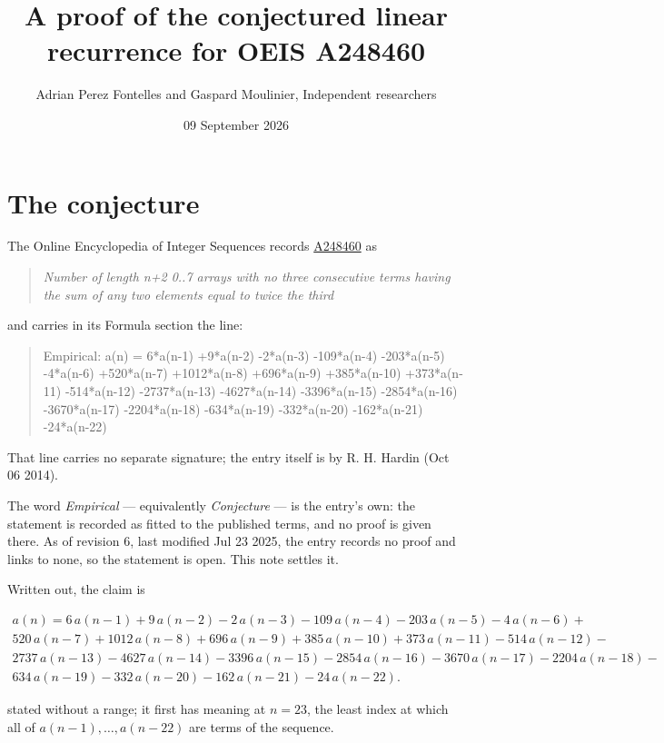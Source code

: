 \documentclass[11pt]{article}
\title{A proof of the conjectured linear recurrence for OEIS A248460}
\author{Adrian Perez Fontelles and Gaspard Moulinier, Independent researchers}
\date{09 September 2026}
\theoremstyle{definition}
\begin{document}
\maketitle
\section{The conjecture}

The Online Encyclopedia of Integer Sequences records \href{https://oeis.org/A248460}{A248460} as

\begin{quote}\itshape Number of length n+2 0..7 arrays with no three consecutive terms having the sum of any two elements equal to twice the third\end{quote}

and carries in its Formula section the line:

\begin{quote}\ttfamily Empirical: a(n) = 6*a(n-1) +9*a(n-2) -2*a(n-3) -109*a(n-4) -203*a(n-5) -4*a(n-6) +520*a(n-7) +1012*a(n-8) +696*a(n-9) +385*a(n-10) +373*a(n-11) -514*a(n-12) -2737*a(n-13) -4627*a(n-14) -3396*a(n-15) -2854*a(n-16) -3670*a(n-17) -2204*a(n-18) -634*a(n-19) -332*a(n-20) -162*a(n-21) -24*a(n-22)\end{quote}

That line carries no separate signature; the entry itself is by R. H. Hardin (Oct 06 2014).

The word {\itshape Empirical} --- equivalently {\itshape Conjecture} --- is the entry's own: the statement is recorded as fitted to the published terms, and no proof is given there. As of revision 6, last modified Jul 23 2025, the entry records no proof and links to none, so the statement is open. This note settles it.

Written out, the claim is

\begin{multline*} a(n) = 6\,a(n-1) + 9\,a(n-2) - 2\,a(n-3) - 109\,a(n-4) - 203\,a(n-5) - 4\,a(n-6) + \\ 520\,a(n-7) + 1012\,a(n-8) + 696\,a(n-9) + 385\,a(n-10) + 373\,a(n-11) - 514\,a(n-12) - \\ 2737\,a(n-13) - 4627\,a(n-14) - 3396\,a(n-15) - 2854\,a(n-16) - 3670\,a(n-17) - 2204\,a(n-18) - \\ 634\,a(n-19) - 332\,a(n-20) - 162\,a(n-21) - 24\,a(n-22). \end{multline*}

stated without a range; it first has meaning at $n = 23$, the least index at which all of $a(n-1),\dots,a(n-22)$ are terms of the sequence.
\end{document}
